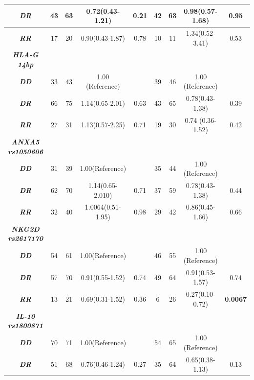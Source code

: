 \documentclass[journal,article,submit,moreauthors,pdftex]{Definitions/mdpi}
\begin{document}
\begin{table}[H]
{\begin{tabular}{ccccccccc}
\textit{\textbf{DR}}         & 43 & 63 & 0.72(0.43-1.21)   & 0.21  & 42 & 63 & 0.98(0.57-1.68)  & 0.95 \\ \hline
\textit{\textbf{RR}}         & 17 & 20 & 0.90(0.43-1.87)   & 0.78  & 10 & 11 & 1.34(0.52-3.41)  & 0.53 \\ \hline
\textit{\textbf{HLA-G 14bp}} &    &    &                   &       &    &    &                  &      \\ \hline
\textit{\textbf{DD}}         & 33 & 43 & 1.00 (Reference)  &       & 39 & 46 & 1.00 (Reference) &      \\ \hline
\textit{\textbf{DR}}         & 66 & 75 & 1.14(0.65-2.01)   & 0.63  & 43 & 65 & 0.78(0.43-1.38)  & 0.39 \\ \hline
\textit{\textbf{RR}}         & 27 & 31 & 1.13(0.57-2.25)   & 0.71  & 19 & 30 & 0.74 (0.36-1.52) & 0.42 \\ \hline
\textit{\textbf{ANXA5 rs1050606}}  &    &    &                   &       &    &    &                  &      \\ \hline
\textit{\textbf{DD}}         & 31 & 39 & 1.00(Reference)   &       & 35 & 44 & 1.00 (Reference) &      \\ \hline
\textit{\textbf{DR}}         & 62 & 70 & 1.14(0.65-2.010)  & 0.71  & 37 & 59 & 0.78(0.43-1.38)  & 0.44 \\ \hline
\textit{\textbf{RR}}         & 32 & 40 & 1.0064(0.51-1.95) & 0.98  & 29 & 42 & 0.86(0.45-1.66)  & 0.66 \\ \hline
\textit{\textbf{NKG2D rs2617170}}  &    &    &                   &       &    &    &                  &      \\ \hline
\textit{\textbf{DD}}         & 54 & 61 & 1.00(Reference)   &       & 46 & 55 & 1.00 (Reference) &      \\ \hline
\textit{\textbf{DR}}         & 57 & 70 & 0.91(0.55-1.52)   & 0.74  & 49 & 64 & 0.91(0.53-1.57)  & 0.74 \\ \hline
\textit{\textbf{RR}} &
  13 &
  21 &
  0.69(0.31-1.52) &
  0.36 &
  6 &
  26 &
  0.27(0.10-0.72) &
  \textbf{0.0067} \\ \hline
\textit{\textbf{IL-10 rs1800871}}  &    &    &                   &       &    &    &                  &      \\ \hline
\textit{\textbf{DD}}         & 70 & 71 & 1.00(Reference)   &       & 54 & 65 & 1.00 (Reference) &      \\ \hline
\textit{\textbf{DR}}         & 51 & 68 & 0.76(0.46-1.24)   & 0.27  & 35 & 64 & 0.65(0.38-1.13)  & 0.13 \\ \hline

\end{tabular}}
\end{table}
\end{document}
